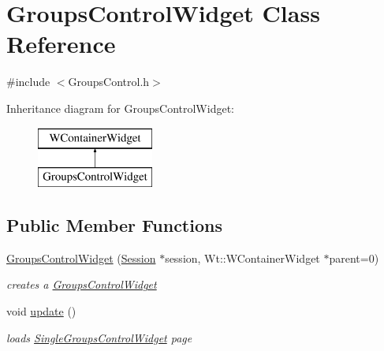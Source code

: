 \hypertarget{class_groups_control_widget}{}\section{Groups\+Control\+Widget Class Reference}
\label{class_groups_control_widget}


{\ttfamily \#include $<$Groups\+Control.\+h$>$}

Inheritance diagram for Groups\+Control\+Widget\+:\begin{figure}[H]
\begin{center}
\leavevmode
\includegraphics[height=2.000000cm]{class_groups_control_widget}
\end{center}
\end{figure}
\subsection*{Public Member Functions}
\begin{DoxyCompactItemize}
\item 
\hyperlink{class_groups_control_widget_a4d6a0e40f6968c53e163c167612932d4}{Groups\+Control\+Widget} (\hyperlink{class_session}{Session} $\ast$session, Wt\+::\+W\+Container\+Widget $\ast$parent=0)
\begin{DoxyCompactList}\small\item\em creates a \hyperlink{class_groups_control_widget}{Groups\+Control\+Widget} \end{DoxyCompactList}\item 
void \hyperlink{class_groups_control_widget_a6b7f7244d67dcdc7e1e946e0e1959f8d}{update} ()
\begin{DoxyCompactList}\small\item\em loads \hyperlink{class_single_groups_control_widget}{Single\+Groups\+Control\+Widget} page \end{DoxyCompactList}\end{DoxyCompactItemize}
